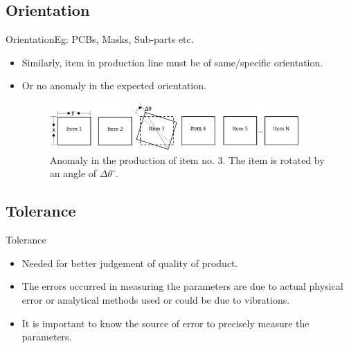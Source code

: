 \documentclass{beamer}
\begin{document}
\subsection{Orientation}

\begin{frame}{Orientation}{Eg: PCBs, Masks, Sub-parts etc.}
  \begin{itemize}
  \item Similarly, item in production line must be of same/specific orientation.
  \item Or no anomaly in the expected orientation.
  \begin{figure}
    \includegraphics[width=0.9\textwidth]{orientation}
    \caption{Anomaly in the production of item no. $3$. The item is rotated by an angle of $\Delta\theta^\circ$.}
    \label{fig:orientation_line}
  \end{figure}
  \end{itemize}
\end{frame}

\subsection{Tolerance}

\begin{frame}{Tolerance}
  \begin{itemize}
  \item Needed for better judgement of quality of product.
  \item The errors occurred in measuring the parameters are due to actual physical error or analytical methods used or could be due to vibrations.
  \item It is important to know the source of error to precisely measure the parameters.
  \end{itemize}
\end{frame}
\end{document}
